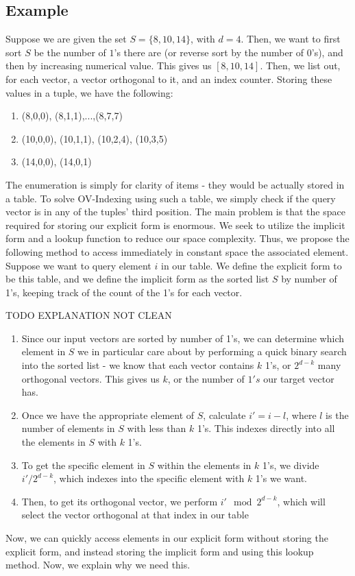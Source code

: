 \documentclass{article}
\begin{document}
\subsection{Example}
Suppose we are given the set $S = \{8,10,14\}$, with $d = 4$. Then, we want to first sort $S$ be the number of $1$'s there are (or reverse sort by the number of $0$'s), and then by increasing numerical value. This gives us $[8,10,14]$. Then, we list out, for each vector, a vector orthogonal to it, and an index counter. Storing these values in a tuple, we have the following:
\begin{enumerate}
    \item (8,0,0), (8,1,1),...,(8,7,7)
    \item (10,0,0), (10,1,1), (10,2,4), (10,3,5)
    \item (14,0,0), (14,0,1)
\end{enumerate}
The enumeration is simply for clarity of items - they would be actually stored in a table. To solve OV-Indexing using such a table, we simply check if the query vector is in any of the tuples' third position. The main problem is that the space required for storing our explicit form is enormous. We seek to utilize the implicit form and a lookup function to reduce our space complexity. Thus, we propose the following method to access immediately in constant space the associated element. Suppose we want to query element $i$ in our table. We define the explicit form to be this table, and we define the implicit form as the sorted list $S$ by number of 1's, keeping track of the count of the 1's for each vector.

TODO EXPLANATION NOT CLEAN
\begin{enumerate}
    \item Since our input vectors are sorted by number of 1's, we can determine which element in $S$ we in particular care about by performing a quick binary search into the sorted list - we know that each vector contains $k$ 1's, or $2^{d-k}$ many orthogonal vectors. This gives us $k$, or the number of $1's$ our target vector has.
    \item Once we have the appropriate element of $S$, calculate $i' = i - l$, where $l$ is the number of elements in $S$ with less than $k$ 1's. This indexes directly into all the elements in $S$ with $k$ 1's.
    \item To get the specific element in $S$ within the elements in $k$ 1's, we divide $i'/2^{d-k}$, which indexes into the specific element with $k$ 1's we want.
    \item Then, to get its orthogonal vector, we perform $i' \mod 2^{d-k}$, which will select the vector orthogonal at that index in our table
\end{enumerate}
Now, we can quickly access elements in our explicit form without storing the explicit form, and instead storing the implicit form and using this lookup method. Now, we explain why we need this.
\end{document}

